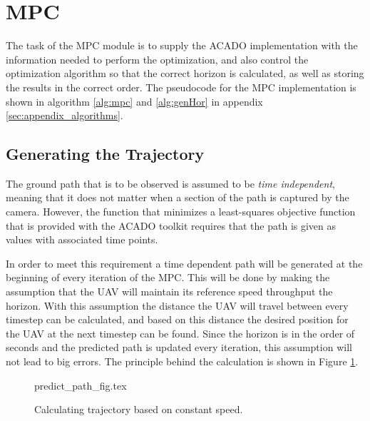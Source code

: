 \section{MPC}

The task of the MPC module is to supply the ACADO implementation with the information needed to perform the optimization, and also control the optimization algorithm so that the correct horizon is calculated, as well as storing the results in the correct order. The pseudocode for the MPC implementation is shown in algorithm \ref{alg:mpc} and \ref{alg:genHor} in appendix \ref{sec:appendix_algorithms}.


\subsection{Generating the Trajectory}
\label{subseq:generating_trajectory}

The ground path that is to be observed is assumed to be \textit{time independent}, meaning that it does not matter when a section of the path is captured by the camera. However, the function that minimizes a least-squares objective function that is provided with the ACADO toolkit requires that the path is given as values with associated time points.

In order to meet this requirement a time dependent path will be generated at the beginning of every iteration of the MPC. This will be done by making the assumption that the UAV will maintain its reference speed throughput the horizon. With this assumption the distance the UAV will travel between every timestep can be calculated, and based on this distance the desired position for the UAV at the next timestep can be found. Since the horizon is in the order of seconds and the predicted path is updated every iteration, this assumption will not lead to big errors. The principle behind the calculation is shown in Figure \ref{fig:predict_path}.

\begin{figure}
	{predict_path_fig.tex}
	\caption{Calculating trajectory based on constant speed.}
	\label{fig:predict_path}
\end{figure}